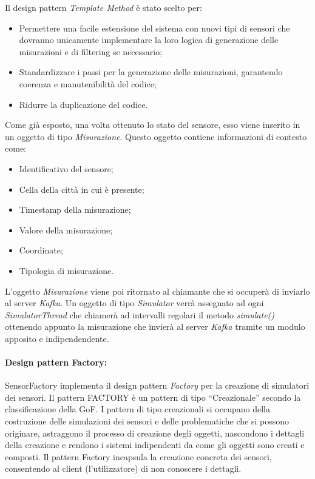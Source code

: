Il design pattern \textit{Template Method} è stato scelto per:
\begin{itemize}
    \item Permettere una facile estensione del sistema con nuovi tipi di sensori che dovranno unicamente implementare la loro logica di generazione delle misurazioni e di filtering se necessario;
    \item Standardizzare i passi per la generazione delle misurazioni, garantendo coerenza e manutenibilità del codice;
    \item Ridurre la duplicazione del codice.
\end{itemize}

Come già esposto, una volta ottenuto lo stato del sensore, esso viene inserito in un oggetto di tipo \textit{Misurazione}. Questo oggetto contiene informazioni di contesto come:
\begin{itemize}
    \item Identificativo del sensore;
    \item Cella della città in cui è presente;
    \item Timestamp della misurazione;
    \item Valore della misurazione;
    \item Coordinate;
    \item Tipologia di misurazione.
\end{itemize}
L'oggetto \textit{Misurazione} viene poi ritornato al chiamante che si occuperà di inviarlo al server \textit{Kafka}.
Un oggetto di tipo \textit{Simulator} verrà assegnato ad ogni \textit{SimulatorThread} che chiamerà ad intervalli regolari il metodo \textit{simulate()} ottenendo appunto la misurazione che invierà al server \textit{Kafka} tramite un modulo apposito e indipendendente.

\paragraph{Design pattern Factory:}
SensorFactory implementa il design pattern \textit{Factory} per la creazione di simulatori dei sensori.
Il pattern FACTORY è un pattern di tipo “Creazionale” secondo la classificazione della GoF.
I pattern di tipo creazionali si occupano della costruzione delle simulazioni dei sensori e delle problematiche che si possono originare, astraggono il processo di creazione degli oggetti, nascondono i dettagli della creazione e rendono i sistemi indipendenti da come gli oggetti sono creati e composti.
Il pattern Factory incapsula la creazione concreta dei sensori, consentendo al client
(l’utilizzatore) di non conoscere i dettagli.


